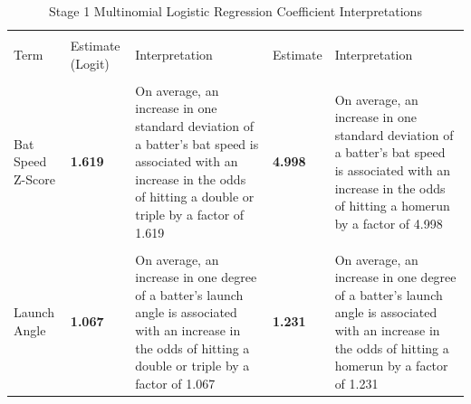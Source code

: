 \documentclass[
  letterpaper,
  DIV=11,
  numbers=noendperiod]{scrartcl}
\begin{document}
\begin{table}[!h]
\centering
\caption{\label{tab:unnamed-chunk-33}Stage 1 Multinomial Logistic Regression Coefficient Interpretations}
\centering
\fontsize{10}{12}\selectfont
\begin{tabular}[t]{>{\raggedright\arraybackslash}p{3cm}>{\raggedright\arraybackslash}p{2cm}>{\raggedright\arraybackslash}p{4cm}>{\raggedright\arraybackslash}p{2cm}>{\raggedright\arraybackslash}p{4cm}}
\toprule
\multicolumn{1}{c}{ } & \multicolumn{2}{c}{Double/Triple} & \multicolumn{2}{c}{Homerun} \\
\cmidrule(l{3pt}r{3pt}){2-3} \cmidrule(l{3pt}r{3pt}){4-5}
Term & Estimate (Logit) & Interpretation & Estimate  & Interpretation \\
\midrule
\cellcolor{gray!10}{Swing Length Z-Score} & \textbf{\cellcolor{gray!10}{1.171}} & \cellcolor{gray!10}{On average, an increase in one standard deviation of a batter's swing length is associated with an increase in the odds of hitting a double or triple by a factor of 1.171.} & \textbf{\cellcolor{gray!10}{1.483}} & \cellcolor{gray!10}{On average, an increase in one standard deviation of a batter's swing length is associated with an increase in the odds of hitting a homerun by a factor of 1.483}\\
Bat Speed Z-Score & \textbf{1.619} & On average, an increase in one standard deviation of a batter's bat speed is associated with an increase in the odds of hitting a double or triple by a factor of 1.619 & \textbf{4.998} & On average, an increase in one standard deviation of a batter's bat speed is associated with an increase in the odds of hitting a homerun by a factor of 4.998\\
\cellcolor{gray!10}{Release Speed Z-Score} & \cellcolor{gray!10}{0.99} & \cellcolor{gray!10}{On average, an increase in one standard deviation of a pitcher's release speed is associated with an decrease in the odds of hitting a double or triple by a factor of 0.99} & \textbf{\cellcolor{gray!10}{1.090}} & \cellcolor{gray!10}{On average, an increase in one standard deviation of a pitcher's release speed is associated with an increase in the odds of hitting a homerun by a factor of 1.090}\\
Launch Angle & \textbf{1.067} & On average, an increase in one degree of a batter's launch angle is associated with an increase in the odds of hitting a double or triple by a factor of 1.067 & \textbf{1.231} & On average, an increase in one degree of a batter's launch angle is associated with an increase in the odds of hitting a homerun by a factor of 1.231\\

\end{tabular}
\end{table}
\end{document}

